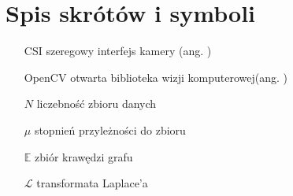 \chapter{Spis skrótów i symboli}

\begin{itemize}
\item[CSI] szeregowy interfejs kamery (ang. )
\item[OpenCV] otwarta biblioteka wizji komputerowej(ang.  )
\item[$N$] liczebność zbioru danych
\item[$\mu$] stopnień przyleżności do zbioru
\item[$\mathbb{E}$] zbiór krawędzi grafu
\item[$\mathcal{L}$] transformata Laplace'a 
\end{itemize}

